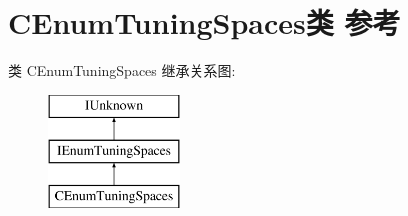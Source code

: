 \hypertarget{class_c_enum_tuning_spaces}{}\section{C\+Enum\+Tuning\+Spaces类 参考}
\label{class_c_enum_tuning_spaces}
类 C\+Enum\+Tuning\+Spaces 继承关系图\+:\begin{figure}[H]
\begin{center}
\leavevmode
\includegraphics[height=3.000000cm]{class_c_enum_tuning_spaces}
\end{center}
\end{figure}
